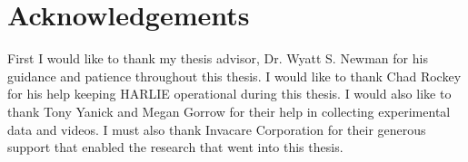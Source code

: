 \section*{Acknowledgements}

First I would like to thank my thesis advisor, Dr. Wyatt S. Newman for his guidance and patience throughout this thesis. I would like to thank Chad Rockey for his help keeping HARLIE operational during this thesis. I would also like to thank Tony Yanick and Megan Gorrow for their help in collecting experimental data and videos. I must also thank Invacare Corporation for their generous support that enabled the research that went into this thesis.